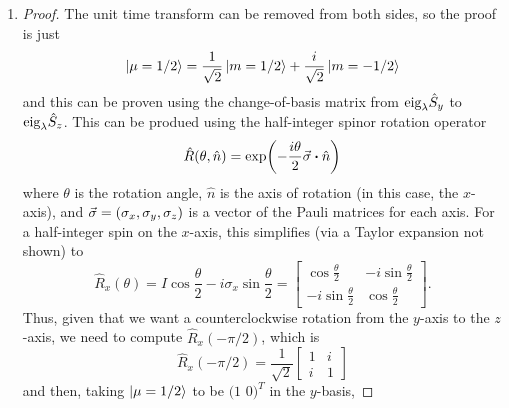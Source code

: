 \begin{enumerate}
  The characteristic frequency is
  \begin{equation*}
    \omega = \frac{B}{2\pi} \abs{\Omega} = \frac{B}{2\pi} \abs{\frac{g_n e}{2 m_n}}
    = \frac{\SI{1E3}{\kilo\gauss}}{2\pi}
    \abs{\frac{(-3.83)(\SI{1.60E-19}{\coulomb})}
         {2(\SI{1.67E-27}{\kilo\gram})}}
    \simeq \SI{2.92}{\mega\hertz}
  \end{equation*}
  and this is a radiowave.
\item[7.5] 
  \begin{proof}
    The unit time transform can be removed from both sides, so the proof is just
    $$\ket{\mu = 1/2} = \frac{1}{\sqrt{2}} \ket{m = 1/2} + \frac{i}{\sqrt{2}} \ket{m = -1/2}$$
    and this can be proven using the change-of-basis matrix from $\text{eig}_\lambda \hat{S}_y$ to $\text{eig}_\lambda \hat{S}_z$. This can be produed using the half-integer spinor rotation operator
    \begin{equation}
      \hat{R}(\theta,\hat{n}) = \exp(-\frac{i\theta}{2} \va{\sigma} \vdot \hat{n})
    \end{equation}
    where $\theta$ is the rotation angle, $\hat{n}$ is the axis of rotation (in this case, the $x$-axis), and $\va{\sigma} = (\sigma_x, \sigma_y, \sigma_z)$ is a vector of the Pauli matrices for each axis. For a half-integer spin on the $x$-axis, this simplifies (via a Taylor expansion not shown) to
    \begin{equation}
      \hat{R}_x(\theta) =
      I \cos \frac{\theta}{2} - i \sigma_x \sin \frac{\theta}{2} =
      \begin{bmatrix}
        \cos \frac{\theta}{2} & -i \sin \frac{\theta}{2} \\
        -i\sin \frac{\theta}{2} & \cos \frac{\theta}{2}
      \end{bmatrix}.
    \end{equation}
    Thus, given that we want a counterclockwise rotation from the
    $y$-axis to the $z$-axis, we need to compute $\hat{R}_x(-\pi/2)$,
    which is
    \begin{equation*}
      \hat{R}_x(-\pi/2) = \frac{1}{\sqrt{2}} \begin{bmatrix}
        1 & i \\ i & 1
      \end{bmatrix}
    \end{equation*}
    and then, taking $\ket{\mu = 1/2}$ to be $(1$ $0)^T$ in the $y$-basis,

\end{proof}
\end{enumerate}
